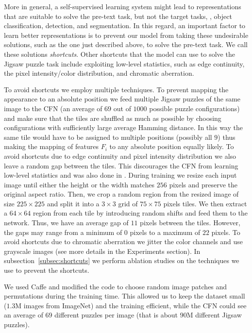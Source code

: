 \documentclass[runningheads]{llncs}
\begin{document}
More in general, a self-supervised learning system might lead to representations that are suitable to solve the pre-text task, but not the target tasks, \eg, object classification, detection, and segmentation. In this regard, an important factor to learn better representations is to prevent our model from taking these undesirable solutions, such as the one just described above, to solve the pre-text task. We call these solutions \emph{shortcuts}.
Other shortcuts that the model can use to solve the Jigsaw puzzle task include exploiting low-level statistics, such as edge continuity, the pixel intensity/color distribution, and chromatic aberration. 

To avoid shortcuts we employ multiple techniques. To prevent mapping the appearance to an absolute position we feed multiple Jigsaw puzzles of the same image to the CFN (an average of $69$ out of $1000$ possible puzzle configurations) and make sure that the tiles are shuffled as much as possible by choosing configurations with sufficiently large average Hamming distance. In this way the same tile would have to be assigned to multiple positions (possibly all $9$) thus making the mapping of features $F_i$ to any absolute position equally likely. 
To avoid shortcuts due to edge continuity and pixel intensity distribution we also leave a random gap between the tiles. This discourages the CFN from learning low-level statistics and was also done in \cite{Carl2015}. During training we resize each input image until either the height or the width matches $256$ pixels and preserve the original aspect ratio. Then, we crop a random region from the resized image of size $225\times225$ and split it into a $3\times 3$ grid of $75\times 75$ pixels tiles. We then extract a $64\times 64$ region from each tile by introducing random shifts and feed them to the network. Thus, we have an average gap of $11$ pixels between the tiles. However, the gaps may range from a minimum of $0$ pixels to a maximum of $22$ pixels.
To avoid shortcuts due to chromatic aberration we jitter the color channels and use grayscale images (see more details in the Experiments section). 
In subsection~\ref{subsec:shortcuts} we perform ablation studies on the techniques we use to prevent the shortcuts. 

We used Caffe \cite{jia2014caffe} and modified the code to choose random image patches and permutations during the training time. This allowed us to keep the dataset small ($1.3$M images from ImageNet) and the training efficient, while the CFN could see an average of $69$ different puzzles per image (that is about $90$M different Jigsaw puzzles). 
\end{document}
